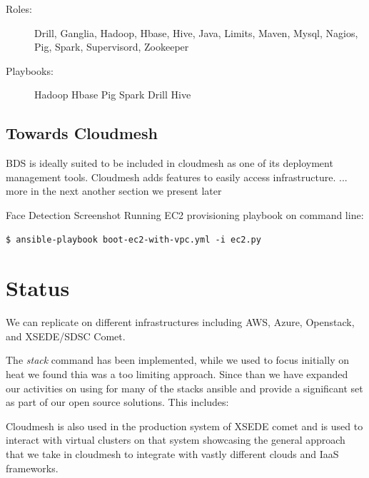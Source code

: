\begin{description}

\item[Roles:]
Drill,
Ganglia,
Hadoop,
Hbase,
Hive,
Java,
Limits,
Maven,
Mysql,
Nagios,
Pig,
Spark,
Supervisord,
Zookeeper

\item[Playbooks:]
Hadoop
Hbase
Pig
Spark
Drill
Hive
\end{description}

\subsection{Towards Cloudmesh}

BDS is ideally suited to be included in cloudmesh as one of its
deployment management tools. Cloudmesh adds features to easily access
infrastructure. ... more in the next another section we present later

Face Detection Screenshot Running EC2 provisioning playbook
on command line:

\begin{Verbatim}
$ ansible-playbook boot-ec2-with-vpc.yml -i ec2.py
\end{Verbatim} 







\section{Status}


We can replicate on different infrastructures including AWS, Azure,
Openstack, and XSEDE/SDSC Comet.

The {\it stack} command has been implemented, while we used to focus initially
on heat we found thia was a too limiting approach. Since than we have
expanded our activities on using for many of the stacks ansible and
provide a significant set as part of our open source solutions. This
includes:


Cloudmesh is also used in the production system of XSEDE comet and is
used to interact with virtual clusters on that system showcasing the
general approach that we take in cloudmesh to integrate with vastly
different clouds and IaaS frameworks.

